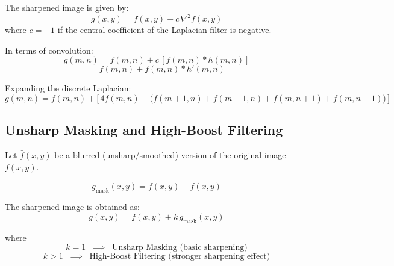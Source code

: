 The sharpened image is given by:
\[
g(x,y) = f(x,y) + c \, \nabla^2 f(x,y)
\]
where $c = -1$ if the central coefficient of the Laplacian filter is negative.

In terms of convolution:
\[
g(m,n) = f(m,n) + c \, [f(m,n) \ast h(m,n)]
\]
\[
= f(m,n) + f(m,n) \ast h'(m,n)
\]

Expanding the discrete Laplacian:
\[
g(m,n) = f(m,n) + \Big[\,4f(m,n) - \big(f(m+1,n) + f(m-1,n) + f(m,n+1) + f(m,n-1)\big)\,\Big]
\]

\subsection*{Unsharp Masking and High-Boost Filtering}

Let $\bar{f}(x,y)$ be a blurred (unsharp/smoothed) version of the original image $f(x,y)$.  

\[
g_{\text{mask}}(x,y) = f(x,y) - \bar{f}(x,y)
\]

The sharpened image is obtained as:  
\[
g(x,y) = f(x,y) + k \, g_{\text{mask}}(x,y)
\]

where  
\[
k = 1 \;\; \implies \;\; \text{Unsharp Masking (basic sharpening)}
\]  
\[
k > 1 \;\; \implies \;\; \text{High-Boost Filtering (stronger sharpening effect)}
\]
